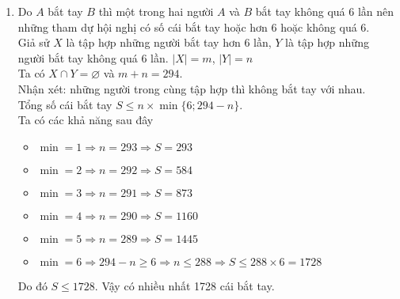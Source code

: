 \begin{ex}
{\begin{enumerate}
\begin{itemize}
     	   \end{itemize}
     	 	Vậy $x=-3$.
     \item  Do $A$ bắt tay $B$ thì một trong hai người $A$ và $B$ bắt tay không quá 6 lần nên những tham dự hội nghị có số cái bắt tay hoặc hơn 6 hoặc không quá 6.\\ Giả sử $X$ là tập hợp những người bắt tay hơn 6 lần, $Y$ là tập hợp những người bắt tay không quá 6 lần. $\vert X \vert=m$, $\vert Y \vert=n$\\
     Ta có $X \cap Y=\varnothing$ và $m+n=294$.\\
     Nhận xét: những người trong cùng tập hợp thì không bắt tay với nhau.\\
     Tổng số cái bắt tay $S\leq n\times \min\lbrace6;294-n\rbrace$.\\
     Ta có các khả năng sau đây
     \begin{itemize}
     \item $\min=1\Rightarrow n=293 \Rightarrow S=293$
     \item $\min=2\Rightarrow n=292 \Rightarrow S=584$
     \item $\min=3\Rightarrow n=291 \Rightarrow S=873$
     \item $\min=4\Rightarrow n=290 \Rightarrow S=1160$
     \item $\min=5\Rightarrow n=289 \Rightarrow S=1445$
     \item $\min=6\Rightarrow 294-n \geq 6 \Rightarrow n\leq 288 \Rightarrow S\leq 288 \times 6 =1728$
     \end{itemize}
     Do đó $S\leq 1728$. Vậy có nhiều nhất 1728 cái bắt tay.
	\end{enumerate}
	}
\end{ex}
